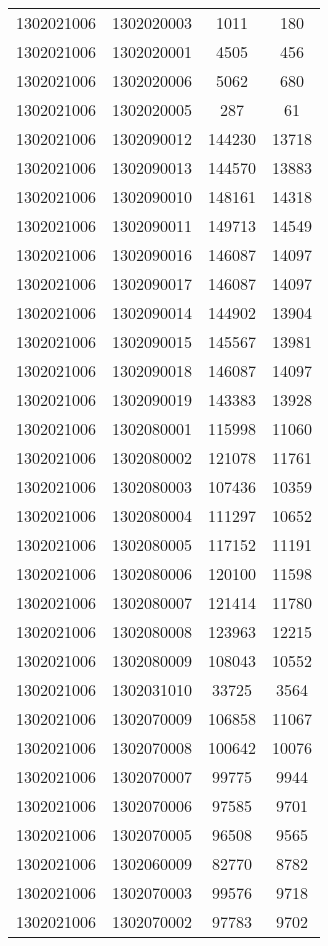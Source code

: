 \begin{longtable}{llcc}
1302021006 & 1302020003 & 1011 & 180\\
1302021006 & 1302020001 & 4505 & 456\\
1302021006 & 1302020006 & 5062 & 680\\
1302021006 & 1302020005 & 287 & 61\\
1302021006 & 1302090012 & 144230 & 13718\\
1302021006 & 1302090013 & 144570 & 13883\\
1302021006 & 1302090010 & 148161 & 14318\\
1302021006 & 1302090011 & 149713 & 14549\\
1302021006 & 1302090016 & 146087 & 14097\\
1302021006 & 1302090017 & 146087 & 14097\\
1302021006 & 1302090014 & 144902 & 13904\\
1302021006 & 1302090015 & 145567 & 13981\\
1302021006 & 1302090018 & 146087 & 14097\\
1302021006 & 1302090019 & 143383 & 13928\\
1302021006 & 1302080001 & 115998 & 11060\\
1302021006 & 1302080002 & 121078 & 11761\\
1302021006 & 1302080003 & 107436 & 10359\\
1302021006 & 1302080004 & 111297 & 10652\\
1302021006 & 1302080005 & 117152 & 11191\\
1302021006 & 1302080006 & 120100 & 11598\\
1302021006 & 1302080007 & 121414 & 11780\\
1302021006 & 1302080008 & 123963 & 12215\\
1302021006 & 1302080009 & 108043 & 10552\\
1302021006 & 1302031010 & 33725 & 3564\\
1302021006 & 1302070009 & 106858 & 11067\\
1302021006 & 1302070008 & 100642 & 10076\\
1302021006 & 1302070007 & 99775 & 9944\\
1302021006 & 1302070006 & 97585 & 9701\\
1302021006 & 1302070005 & 96508 & 9565\\
1302021006 & 1302060009 & 82770 & 8782\\
1302021006 & 1302070003 & 99576 & 9718\\
1302021006 & 1302070002 & 97783 & 9702\\

\end{longtable}
